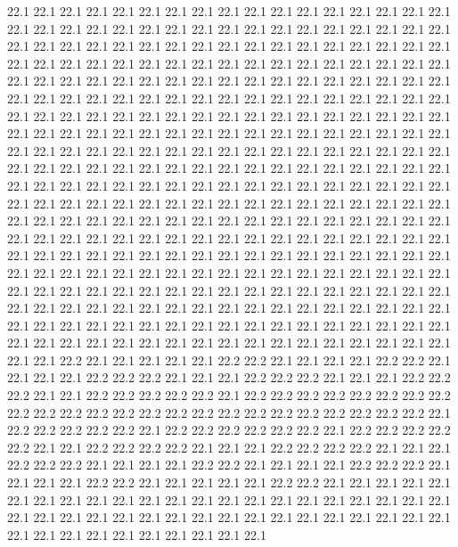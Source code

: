 22.1
22.1
22.1
22.1
22.1
22.1
22.1
22.1
22.1
22.1
22.1
22.1
22.1
22.1
22.1
22.1
22.1
22.1
22.1
22.1
22.1
22.1
22.1
22.1
22.1
22.1
22.1
22.1
22.1
22.1
22.1
22.1
22.1
22.1
22.1
22.1
22.1
22.1
22.1
22.1
22.1
22.1
22.1
22.1
22.1
22.1
22.1
22.1
22.1
22.1
22.1
22.1
22.1
22.1
22.1
22.1
22.1
22.1
22.1
22.1
22.1
22.1
22.1
22.1
22.1
22.1
22.1
22.1
22.1
22.1
22.1
22.1
22.1
22.1
22.1
22.1
22.1
22.1
22.1
22.1
22.1
22.1
22.1
22.1
22.1
22.1
22.1
22.1
22.1
22.1
22.1
22.1
22.1
22.1
22.1
22.1
22.1
22.1
22.1
22.1
22.1
22.1
22.1
22.1
22.1
22.1
22.1
22.1
22.1
22.1
22.1
22.1
22.1
22.1
22.1
22.1
22.1
22.1
22.1
22.1
22.1
22.1
22.1
22.1
22.1
22.1
22.1
22.1
22.1
22.1
22.1
22.1
22.1
22.1
22.1
22.1
22.1
22.1
22.1
22.1
22.1
22.1
22.1
22.1
22.1
22.1
22.1
22.1
22.1
22.1
22.1
22.1
22.1
22.1
22.1
22.1
22.1
22.1
22.1
22.1
22.1
22.1
22.1
22.1
22.1
22.1
22.1
22.1
22.1
22.1
22.1
22.1
22.1
22.1
22.1
22.1
22.1
22.1
22.1
22.1
22.1
22.1
22.1
22.1
22.1
22.1
22.1
22.1
22.1
22.1
22.1
22.1
22.1
22.1
22.1
22.1
22.1
22.1
22.1
22.1
22.1
22.1
22.1
22.1
22.1
22.1
22.1
22.1
22.1
22.1
22.1
22.1
22.1
22.1
22.1
22.1
22.1
22.1
22.1
22.1
22.1
22.1
22.1
22.1
22.1
22.1
22.1
22.1
22.1
22.1
22.1
22.1
22.1
22.1
22.1
22.1
22.1
22.1
22.1
22.1
22.1
22.1
22.1
22.1
22.1
22.1
22.1
22.1
22.1
22.1
22.1
22.1
22.1
22.1
22.1
22.1
22.1
22.1
22.1
22.1
22.1
22.1
22.1
22.1
22.1
22.1
22.1
22.1
22.1
22.1
22.1
22.1
22.1
22.1
22.1
22.1
22.1
22.1
22.1
22.1
22.1
22.1
22.1
22.1
22.1
22.1
22.1
22.1
22.1
22.1
22.1
22.1
22.1
22.1
22.1
22.1
22.1
22.1
22.1
22.1
22.1
22.1
22.1
22.1
22.1
22.1
22.1
22.1
22.1
22.1
22.1
22.1
22.1
22.1
22.1
22.1
22.1
22.1
22.1
22.1
22.1
22.1
22.1
22.1
22.1
22.1
22.1
22.1
22.1
22.1
22.1
22.1
22.1
22.1
22.1
22.1
22.1
22.1
22.1
22.1
22.1
22.1
22.2
22.1
22.1
22.1
22.1
22.1
22.2
22.2
22.1
22.1
22.1
22.1
22.2
22.2
22.1
22.1
22.1
22.1
22.2
22.2
22.2
22.1
22.1
22.1
22.2
22.2
22.2
22.1
22.1
22.1
22.2
22.2
22.2
22.1
22.1
22.2
22.2
22.2
22.2
22.2
22.1
22.2
22.2
22.2
22.2
22.2
22.2
22.2
22.2
22.2
22.2
22.2
22.2
22.2
22.2
22.2
22.2
22.2
22.2
22.2
22.2
22.2
22.2
22.2
22.2
22.1
22.2
22.2
22.2
22.2
22.2
22.1
22.2
22.2
22.2
22.2
22.2
22.2
22.1
22.2
22.2
22.2
22.2
22.2
22.1
22.1
22.2
22.2
22.2
22.2
22.1
22.1
22.1
22.2
22.2
22.2
22.2
22.1
22.1
22.1
22.2
22.2
22.2
22.1
22.1
22.1
22.1
22.2
22.2
22.1
22.1
22.1
22.1
22.2
22.2
22.2
22.1
22.1
22.1
22.1
22.2
22.2
22.1
22.1
22.1
22.1
22.1
22.2
22.2
22.1
22.1
22.1
22.1
22.1
22.1
22.1
22.1
22.1
22.1
22.1
22.1
22.1
22.1
22.1
22.1
22.1
22.1
22.1
22.1
22.1
22.1
22.1
22.1
22.1
22.1
22.1
22.1
22.1
22.1
22.1
22.1
22.1
22.1
22.1
22.1
22.1
22.1
22.1
22.1
22.1
22.1
22.1
22.1
22.1
22.1
22.1
22.1
22.1
